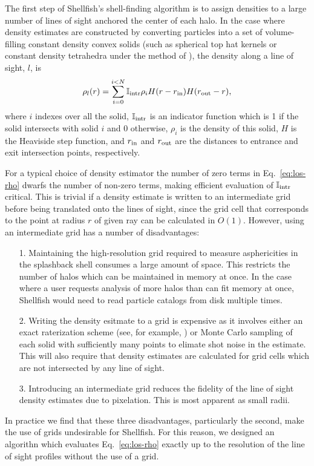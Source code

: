 \documentclass[numberedappendix,apj]{emulateapj}
\begin{document}
The first step of Shellfish's shell-finding algorithm is to assign densities to
a large number of lines of sight anchored the center of each halo. In the case
where density estimates are constructed by converting particles into a set of
volume-filling constant density convex solids (such as spherical top hat kernels
or constant density tetrahedra under the method of \citealt{abel_et_al_12}), the density along a line of sight, $l$, is
\begin{equation}
        \label{eq:los-rho}
        \rho_l(r) = \sum_{i=0}^{i<N}\mathbb{I}_{\rm intr}\rho_i
        H(r - r_{\rm in})H(r_{\rm out} - r),
\end{equation}
where $i$ indexes over all the solid, $\mathbb{I}_{\rm intr}$ is an indicator
function which is 1 if the solid intersects with solid $i$ and 0 otherwise,
$\rho_i$ is the density of this solid, $H$ is the Heaviside step function, and
$r_{\rm in}$ and $r_{\rm out}$ are the distances to entrance and exit
intersection points, respectively.

For a typical choice of density estimator the number of zero terms in
Eq.~\ref{eq:los-rho} dwarfs the number of non-zero terms, making efficient
evaluation of $\mathbb{I}_{\rm intr}$ critical. This is trivial if a density
estimate is written to an intermediate grid before being translated onto the
lines of sight, since the grid cell that corresponds to the point
at radius $r$ of given ray can be calculated in $O(1)$. However, using an
intermediate grid has a number of disadvantages:
\begin{enumerate}
        \item[1.] Maintaining the high-resolution grid required to measure
        asphericities in the splashback shell consumes
        a large amount of space. This restricts the number of halos which
        can be maintained in memory at once. In the case where a user requests
        analysis of more halos than can fit memory at once, Shellfish would need
        to read particle catalogs from disk multiple times.
        \item[2.] Writing the density esitmate to a grid is expensive as it
        involves either an exact raterization scheme (see, for example,
        \citealt{powell_abel_14}) or Monte Carlo sampling of each solid with
        sufficiently many points to elimate shot noise in the estimate. This
        will also require that density estimates are calculated for grid cells
        which are not intersected by any line of sight.
        \item[3.] Introducing an intermediate grid reduces the fidelity of the
        line of sight density estimates due to pixelation. This is most apparent as small
        radii.
\end{enumerate}
In practice we find that these three disadvantages, particularly the second,
make the use of grids undesirable for Shellfish. For this reason, we designed an
algorithn which evaluates Eq.~\ref{eq:los-rho} exactly up to the resolution of
the line of sight profiles without the use of a grid.
\end{document}
